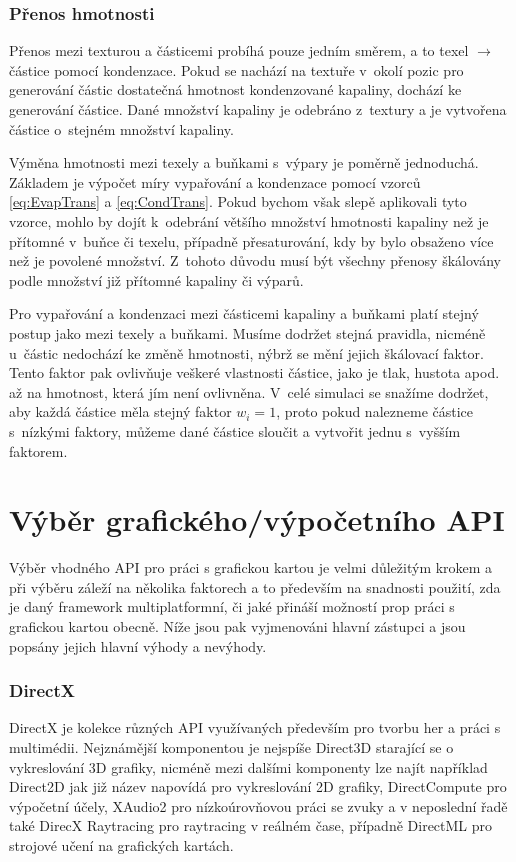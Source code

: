 \subsubsection{Přenos hmotnosti}
Přenos mezi texturou a částicemi probíhá pouze jedním směrem, a to texel $\rightarrow$ částice pomocí kondenzace. Pokud se nachází na textuře v~okolí pozic pro generování částic dostatečná hmotnost kondenzované kapaliny, dochází ke generování částice. Dané množství kapaliny je odebráno z~textury a je vytvořena částice o~stejném množství kapaliny.

Výměna hmotnosti mezi texely a buňkami s~výpary je poměrně jednoduchá. Základem je výpočet míry vypařování a kondenzace pomocí vzorců \ref{eq:EvapTrans} a \ref{eq:CondTrans}. Pokud bychom však slepě aplikovali tyto vzorce, mohlo by dojít k~odebrání většího množství hmotnosti kapaliny než je přítomné v~buňce či texelu, případně přesaturování, kdy by bylo obsaženo více než je povolené množství. Z~tohoto důvodu musí být všechny přenosy škálovány podle množství již přítomné kapaliny či výparů.

Pro vypařování a kondenzaci mezi částicemi kapaliny a buňkami platí stejný postup jako mezi texely a buňkami. Musíme dodržet stejná pravidla, nicméně u~částic nedochází ke změně hmotnosti, nýbrž se mění jejich škálovací faktor. Tento faktor pak ovlivňuje veškeré vlastnosti částice, jako je tlak, hustota apod. až na hmotnost, která jím není ovlivněna. V~celé simulaci se snažíme dodržet, aby každá částice měla stejný faktor $w_i = 1$, proto pokud nalezneme částice s~nízkými faktory, můžeme dané částice sloučit a vytvořit jednu s~vyšším faktorem.

\section{Výběr grafického/výpočetního API}
Výběr vhodného API pro práci s grafickou kartou je velmi důležitým krokem a při výběru záleží na několika faktorech a to především na snadnosti použití, zda je daný framework multiplatformní, či jaké přináší možností prop práci s grafickou kartou obecně. Níže jsou pak vyjmenováni hlavní zástupci a jsou popsány jejich hlavní výhody a nevýhody.
\subsubsection{DirectX}
DirectX je kolekce různých API využívaných především pro tvorbu her a práci s multimédii. Nejznámější komponentou je nejspíše Direct3D starající se o vykreslování 3D grafiky, nicméně mezi dalšími komponenty lze najít například Direct2D jak již název napovídá pro vykreslování 2D grafiky, DirectCompute pro výpočetní účely, XAudio2 pro nízkoúrovňovou práci se zvuky a v neposlední řadě také DirecX Raytracing pro raytracing v reálném čase, případně DirectML pro strojové učení na grafických kartách.

